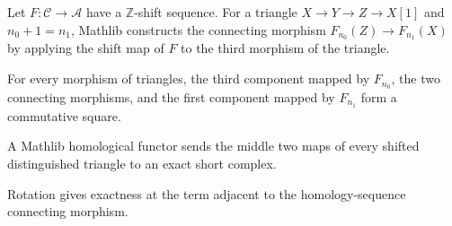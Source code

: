 \begin{definition}
  \label{def:mathlib-homology-sequence-connecting}
  \mathlibok
  Let $F:\mathcal C\to\mathcal A$ have a $\mathbb Z$-shift sequence.  For a
  triangle $X\to Y\to Z\to X[1]$ and $n_0+1=n_1$, Mathlib constructs the
  connecting morphism $F_{n_0}(Z)\to F_{n_1}(X)$ by applying the shift map of
  $F$ to the third morphism of the triangle.
\end{definition}

\begin{theorem}
  \label{thm:mathlib-homology-sequence-connecting-naturality}
  \mathlibok
  For every morphism of triangles, the third component mapped by $F_{n_0}$,
  the two connecting morphisms, and the first component mapped by $F_{n_1}$
  form a commutative square.
\end{theorem}

\begin{theorem}
  \label{thm:mathlib-homology-sequence-exact-two}
  \mathlibok
  A Mathlib homological functor sends the middle two maps of every shifted
  distinguished triangle to an exact short complex.
\end{theorem}

\begin{theorem}
  \label{thm:mathlib-homology-sequence-exact-three}
  \mathlibok
  Rotation gives exactness at the term adjacent to the homology-sequence
  connecting morphism.
\end{theorem}

